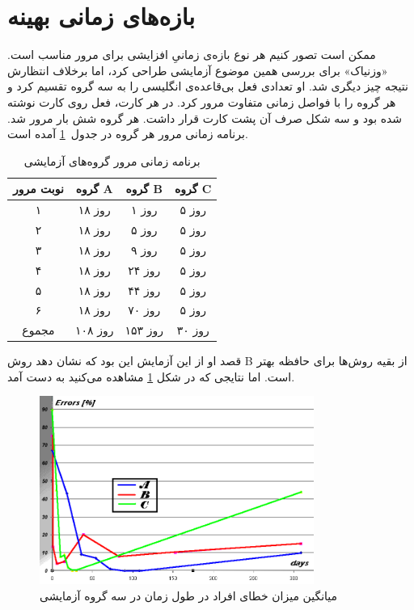 \documentclass[12pt]{report}
\begin{document}
\section{بازه‌های زمانی بهینه}

ممکن است تصور کنیم هر نوع بازه‌ی زمانیِ افزایشی برای مرور مناسب است. 
«وزنیاک» برای بررسی همین موضوع آزمایشی طراحی کرد، اما برخلاف انتظارش نتیجه چیز دیگری شد.
او تعدادی فعل بی‌قاعده‌ی انگلیسی را به سه گروه تقسیم کرد و هر گروه را با فواصل زمانی متفاوت مرور کرد.
 در هر کارت، فعل روی کارت نوشته شده بود و سه شکل صرف آن پشت کارت قرار داشت.
هر گروه شش بار مرور شد.
برنامه زمانی مرور هر گروه در جدول~\ref{tbl:repetition_schedule} آمده است.


\begin{table}[h!]
    \centering
    \caption{برنامه زمانی مرور گروه‌های آزمایشی}
    \label{tbl:repetition_schedule}
    \begin{tabular}{|c|c|c|c|}
        \hline
        نوبت مرور & گروه A & گروه B & گروه C \\
        \hline
        ۱ & ۱۸ روز & ۱ روز & ۵ روز \\
        \hline
        ۲ & ۱۸ روز & ۵ روز & ۵ روز \\
        \hline
        ۳ & ۱۸ روز & ۹ روز & ۵ روز \\
        \hline
        ۴ & ۱۸ روز & ۲۴ روز & ۵ روز \\
        \hline
        ۵ & ۱۸ روز & ۴۴ روز & ۵ روز \\
        \hline
        ۶ & ۱۸ روز & ۷۰ روز & ۵ روز \\
        \hline
        مجموع & ۱۰۸ روز & ۱۵۳ روز & ۳۰ روز \\
        \hline
    \end{tabular}
\end{table}

قصد او از این آزمایش این بود که نشان دهد روش B از بقیه روش‌ها برای حافظه بهتر است. اما نتایجی که در شکل 
\ref{fig:three-group-repetition.png}
مشاهده می‌کنید به دست آمد.

\begin{figure}[h!]
  \centering
  \includegraphics[width=0.8\textwidth]{images/three-group-repetition.png}
  \caption{میانگین میزان خطای افراد در طول زمان در سه گروه آزمایشی}
  \label{fig:three-group-repetition.png}
\end{figure}
\end{document}
